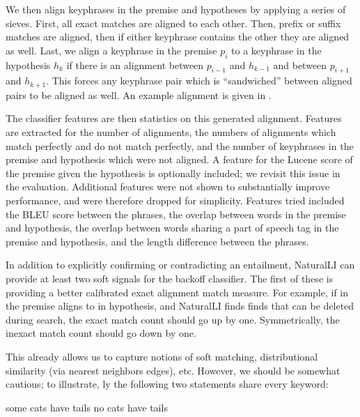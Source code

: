 We then align keyphrases in the premise and hypotheses by applying a series of sieves.
First, all exact matches are aligned to each other.
Then, prefix or suffix matches are aligned, then if either keyphrase contains
  the other they are aligned as well.
Last, we align a keyphrase in the premise $p_i$ to a keyphrase in the hypothesis
  $h_k$ if there is an alignment between $p_{i-1}$ and $h_{k-1}$ and between
  $p_{i+1}$ and $h_{k+1}$.
This forces any keyphrase pair which is ``sandwiched'' between aligned pairs to be
  aligned as well.
An example alignment is given in .

The classifier features are then statistics on this generated alignment.
Features are extracted for the number of alignments, the numbers of alignments
  which match perfectly and do not match perfectly, 
  and the number of keyphrases in the premise and hypothesis
  which were not aligned.
A feature for the Lucene score of the premise given the hypothesis is optionally
  included; we revisit this issue in the evaluation.
Additional features were not shown to substantially improve performance, and
  were therefore dropped for simplicity.
Features tried included the BLEU score between the phrases, the overlap between
  words in the premise and hypothesis, the overlap between words sharing a 
  part of speech tag in the premise and hypothesis, and the length difference
  between the phrases.

%
%
In addition to explicitly confirming or contradicting an entailment, NaturalLI can
  provide at least two soft signals for the backoff classifier.
The first of these is providing a better calibrated exact alignment match measure.
For example, if  in the premise aligns to  in hypothesis,
  and NaturalLI finds finds that  can be deleted during search, the
  exact match count should go up by one.
Symmetrically, the inexact match count should go down by one.

This already allows us to capture notions of soft matching, distributional similarity
  (via nearest neighbors edges), etc.
However, we should be somewhat cautious; to illustrate, 
  \naive ly the following two statements share every keyword:

\entailmentExample
{some cats have tails}
{no cats have tails}


